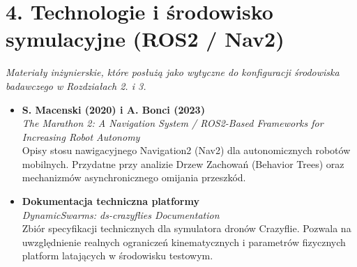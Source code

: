 \documentclass[12pt,a4paper]{article}
\newcommand{\lit}[3]{%
  \item
  \textbf{#1}\\[0.15em]
  \textit{#2}\\[0.35em]
  #3%
}
\begin{document}
\section*{4. Technologie i środowisko symulacyjne
(ROS2 / Nav2)}
\textit{Materiały inżynierskie, które posłużą jako
wytyczne do konfiguracji środowiska badawczego
w Rozdziałach 2. i 3.}

\begin{itemize}[leftmargin=*, itemsep=1.1em]
    \lit{S. Macenski (2020) i A. Bonci (2023)}
        {The Marathon 2: A Navigation System /
        ROS2-Based Frameworks for Increasing Robot
        Autonomy}
        {Opisy stosu nawigacyjnego Navigation2 (Nav2)
        dla autonomicznych robotów mobilnych.
        Przydatne przy analizie Drzew Zachowań
        (Behavior Trees) oraz mechanizmów
        asynchronicznego omijania przeszkód.}

    \lit{Dokumentacja techniczna platformy}
        {DynamicSwarms: ds-crazyflies Documentation}
        {Zbiór specyfikacji technicznych dla
        symulatora dronów Crazyflie. Pozwala na
        uwzględnienie realnych ograniczeń
        kinematycznych i parametrów fizycznych
        platform latających w środowisku testowym.}
\end{itemize}
\end{document}
